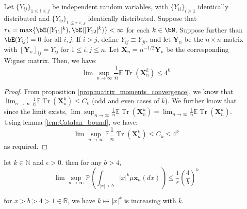 \begin{lemma}
    \label{lem:bound_for_expectation_trace}
    \notready
    Let $\{Y_{ij}\}_{1 \leq i \leq j}$ be independent random variables, with $\{Y_{ii}\}_{i\geq 1}$ identically distributed and $\{Y_{ij}\}_{1 \leq i < j}$ identically distributed. Suppose that $r_k = \max\{\bE(|Y_{11}|^k),\bE(|Y_{12}|^k)\} < \infty$ for each $k\in\bN$. Suppose further than $\bE(Y_{ij})=0$ for all $i,j$. If $i>j$, define $Y_{ij} \equiv Y_{ji}$, and let $\mathbf{Y}_n$ be the $n\times n$ matrix with $[\mathbf{Y}_n]_{ij} = Y_{ij}$ for $1\le i,j\le n$. Let $\mathbf{X}_n = n^{-1/2}\mathbf{Y}_n$ be the corresponding Wigner matrix. Then, we have:
    $$
    \lim \sup_{n\to\infty} \frac{1}{n}\mathbb{E}\operatorname{Tr} (\mathbf{X}_{n}^{k}) \leq 4^{k}
    $$ 
\end{lemma}
\begin{proof}
    From proposition \ref{prop:matrix_moments_convergence}, we know that $\lim_{n\to\infty} \frac{1}{n}\mathbb{E}\operatorname{Tr}(\mathbf{X}_{n}^{k}) \leq C_{k}$ (odd and even cases of $k$). We further know that since the limit exists, $\lim \sup_{n\to\infty} \frac{1}{n}\mathbb{E}\operatorname{Tr}(\mathbf{X}_{n}^{k}) = \lim_{n\to\infty} \frac{1}{n}\mathbb{E}\operatorname{Tr}(\mathbf{X}_{n}^{k})$. Using lemma \ref{lem:Catalan_bound}, we have:
     $$
     \lim \sup_{n\to\infty }\mathbb{E}\frac{1}{n}\operatorname{Tr}(\mathbf{X}_{n}^{k}) \leq C_{k} \leq 4^{k}
    $$ 
    as required.
\end{proof}

\begin{lemma}
    \label{lem:new_bound_for_lim_sup_p}
    \notready
    let $k \in \mathbb{N}$ and  $\epsilon > 0$. then for any  $b > 4$, 
     $$
    \lim \sup_{n\to\infty} \mathbb{P}(\int_{|x| > b}|x|^{k} \mu \mathbf{x}_{n}(dx)) \leq \frac{1}{\epsilon}(\frac{4}{b})^{k}
    $$ 
\end{lemma}

\begin{lemma}
    \label{lem:increasing_sequence_x_to_k}
    \notready

    for $x > b > 4 > 1 \in \mathbb{R}$, we have $k \mapsto |x|^{k}$ is increasing with $k$.
\end{lemma}

